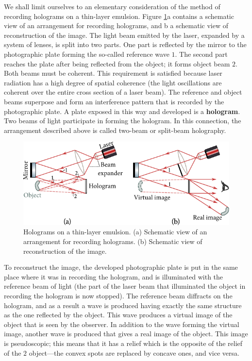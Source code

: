 We shall limit ourselves to an elementary consideration of the method of recording holograms on a thin-layer emulsion.
Figure \ref{fig:18_49}a contains a schematic view of an arrangement for recording holograms,
and b a schematic view of reconstruction of the image.
The light beam emitted by the laser, expanded by a system of lenses, is split into two parts.
One part is reflected by the mirror to the photographic plate forming the so-called reference wave $1$.
The second part reaches the plate after being reflected from the object; it forms object beam $2$.
Both beams must be coherent.
This requirement is satisfied because laser radiation has a high degree of spatial coherence (the light oscillations are coherent over the entire cross section of a laser beam).
The reference and object beams superpose and form an interference pattern that is recorded by the photographic plate.
A plate exposed in this way and developed is a \textbf{hologram}.
Two beams of light participate in forming the hologram.
In this connection, the arrangement described above is called two-beam or split-beam holography.

\begin{figure}[t]
	\begin{center}
		\includegraphics[scale=1]{figures/ch_18/fig_18_49.pdf}
        \caption[]{Holograms on a thin-layer emulsion. (a) Schematic view of an arrangement for recording holograms. (b) Schematic view of reconstruction of the image.}
		\label{fig:18_49}
	\end{center}
	\vspace{-0.8cm}
\end{figure}

To reconstruct the image, the developed photographic plate is put in the same place where it was in recording the hologram, and is illuminated with the reference beam of light (the part of the laser beam that illuminated the object in recording the hologram is now stopped).
The reference beam diffracts on the hologram, and as a result a wave is produced having exactly the same structure as the one reflected by the object.
This wave produces a virtual image of the object that is seen by the observer.
In addition to the wave forming the virtual image, another wave is produced that gives a real
image of the object.
This image is pseudoscopic; this means that it has a relief which is the opposite of the relief of the $2$ object---the convex spots are replaced by concave ones, and vice versa.

